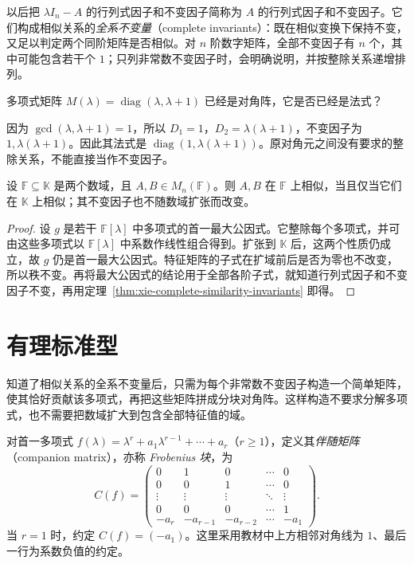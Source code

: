 以后把 $\lambda I_n-A$ 的行列式因子和不变因子简称为 $A$ 的行列式因子和不变因子。它们构成相似关系的\emph{全系不变量}（complete invariants）：既在相似变换下保持不变，又足以判定两个同阶矩阵是否相似。对 $n$ 阶数字矩阵，全部不变因子有 $n$ 个，其中可能包含若干个 $1$；只列非常数不变因子时，会明确说明，并按整除关系递增排列。

\begin{example}
\label{ex:xie-diagonal-not-smith}
多项式矩阵 $M(\lambda)=\operatorname{diag}(\lambda,\lambda+1)$ 已经是对角阵，它是否已经是法式？
\end{example}
\begin{solve}
因为 $\gcd(\lambda,\lambda+1)=1$，所以 $D_1=1$，$D_2=\lambda(\lambda+1)$，不变因子为 $1,\lambda(\lambda+1)$。因此其法式是 $\operatorname{diag}(1,\lambda(\lambda+1))$。原对角元之间没有要求的整除关系，不能直接当作不变因子。
\end{solve}

\begin{corollary}
\label{cor:xie-similarity-field-extension}
设 $\mathbb F\subseteq\mathbb K$ 是两个数域，且 $A,B\in M_n(\mathbb F)$。则 $A,B$ 在 $\mathbb F$ 上相似，当且仅当它们在 $\mathbb K$ 上相似；其不变因子也不随数域扩张而改变。
\end{corollary}
\begin{proof}
设 $g$ 是若干 $\mathbb F[\lambda]$ 中多项式的首一最大公因式。它整除每个多项式，并可由这些多项式以 $\mathbb F[\lambda]$ 中系数作线性组合得到。扩张到 $\mathbb K$ 后，这两个性质仍成立，故 $g$ 仍是首一最大公因式。特征矩阵的子式在扩域前后是否为零也不改变，所以秩不变。再将最大公因式的结论用于全部各阶子式，就知道行列式因子和不变因子不变，再用定理~\ref{thm:xie-complete-similarity-invariants} 即得。
\end{proof}

\section{有理标准型}
\label{sec:xie-rational-canonical}

知道了相似关系的全系不变量后，只需为每个非常数不变因子构造一个简单矩阵，使其恰好贡献该多项式，再把这些矩阵拼成分块对角阵。这样构造不要求分解多项式，也不需要把数域扩大到包含全部特征值的域。

\begin{definition}
\label{def:xie-companion-matrix}
对首一多项式 $f(\lambda)=\lambda^r+a_1\lambda^{r-1}+\cdots+a_r$（$r\ge1$），定义其\emph{伴随矩阵}（companion matrix），亦称 \emph{Frobenius 块}，为
\begin{equation}
\label{eq:xie-companion-matrix}
    C(f)=\begin{pmatrix}
        0&1&0&\cdots&0\\
        0&0&1&\cdots&0\\
        \vdots&\vdots&\vdots&\ddots&\vdots\\
        0&0&0&\cdots&1\\
        -a_r&-a_{r-1}&-a_{r-2}&\cdots&-a_1
    \end{pmatrix}.
\end{equation}
当 $r=1$ 时，约定 $C(f)=(-a_1)$。这里采用教材中上方相邻对角线为 $1$、最后一行为系数负值的约定。
\end{definition}

